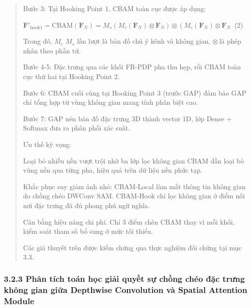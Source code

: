 \documentclass[
]{article}
\begin{document}
\begin{quote}
Bước 3: Tại Hooking Point 1, CBAM toàn cục được áp dụng:

\(\mathbf{F}'_{\text{hook1}} = \text{CBAM}\left( \mathbf{F}_{N} \right) = M_{s}\left( M_{c}\left( \mathbf{F}_{N} \right) \otimes \mathbf{F}_{N} \right) \otimes \left( M_{c}\left( \mathbf{F}_{N} \right) \otimes \mathbf{F}_{N} \right.\ \)
(2)

Trong đó, \(M_{c}\) \(M_{s}\) lần lượt là bản đồ chú ý kênh và không
gian, \(\otimes \ \)là phép nhân theo phần tử.

Bước 4-5: Đặc trưng qua các khối FR-PDP pha thu hẹp, rồi CBAM toàn cục
thứ hai tại Hooking Point 2.

Bước 6: CBAM cuối cùng tại Hooking Point 3 (trước GAP) đảm bảo GAP chỉ
tổng hợp từ vùng không gian mang tính phân biệt cao.

Bước 7: GAP nén bản đồ đặc trưng 3D thành vector 1D, lớp Dense + Softmax
đưa ra phân phối xác suất.

Ưu thế kỳ vọng:

Loại bỏ nhiễu nền vượt trội nhờ ba lớp lọc không gian CBAM dần loại bỏ
vùng nền qua từng pha, hiệu quả trên dữ liệu nền phức tạp.

Khắc phục suy giảm ảnh nhỏ: CBAM-Local làm mất thông tin không gian do
chồng chéo DWConv SAM. CBAM-Hook chỉ lọc không gian ở điểm nối nơi đặc
trưng đã đủ phong phú ngữ nghĩa.

Cân bằng hiệu năng chi phí. Chỉ 3 điểm chèn CBAM thay vì mỗi khối, kiểm
soát tham số bổ sung ở mức tối thiểu.

Các giả thuyết trên được kiểm chứng qua thực nghiệm đối chứng tại mục
3.3.
\end{quote}

\hypertarget{phuxe2n-tuxedch-touxe1n-hux1ecdc-giux1ea3i-quyux1ebft-sux1ef1-chux1ed3ng-chuxe9o-ux111ux1eb7c-trux1b0ng-khuxf4ng-gian-giux1eefa-depthwise-convolution-vuxe0-spatial-attention-module}{%
\subsubsection{3.2.3 Phân tích toán học giải quyết sự chồng chéo đặc
trưng không gian giữa Depthwise Convolution và Spatial Attention
Module}\label{phuxe2n-tuxedch-touxe1n-hux1ecdc-giux1ea3i-quyux1ebft-sux1ef1-chux1ed3ng-chuxe9o-ux111ux1eb7c-trux1b0ng-khuxf4ng-gian-giux1eefa-depthwise-convolution-vuxe0-spatial-attention-module}}
\end{document}
